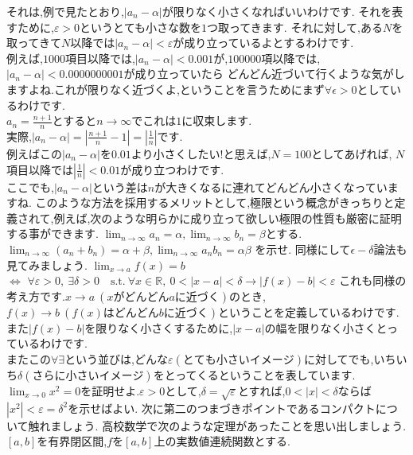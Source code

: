 それは,例で見たとおり,$|a_n - \alpha|$が限りなく小さくなればいいわけです.
それを表すために,$\varepsilon > 0$というとても小さな数を$1$つ取ってきます.
それに対して,ある$N$を取ってきて$N$以降では$|a_n - \alpha | < \varepsilon$が成り立っているよとするわけです.\\
例えば,$1000$項目以降では,$|a_n - \alpha| < 0.001$が,$100000$項以降では,$|a_n - \alpha | < 0.0000000001$が成り立っていたら
どんどん近づいて行くような気がしますよね.これが限りなく近づくよ,ということを言うためにまず$\forall \epsilon > 0$としているわけです.\\
\ex
$a_n = \frac{n+1}{n}$とすると$n \to \infty $でこれは$1$に収束します.\\
実際,$|a_n - \alpha| = | \frac{n+1}{n} - 1 | = | \frac{1}{n} |$です.\\
例えばこの$|a_n - \alpha|$を$0.01$より小さくしたい!と思えば,$N=100$としてあげれば,
$N$項目以降では$|\frac{1}{n}| < 0.01$が成り立つわけです.\\
ここでも,$|a_n - \alpha| $という差は$n$が大きくなるに連れてどんどん小さくなっていますね.
\exx
このような方法を採用するメリットとして,極限という概念がきっちりと定義されて,例えば,次のような明らかに成り立って欲しい極限の性質も厳密に証明する事ができます.
\prob
$\lim_{n\to\infty} a_n = \alpha , \lim_{n\to\infty} b_n = \beta $とする.\\
$\lim_{n\to\infty} (a_n + b_n) = \alpha + \beta , \lim_{n\to\infty} a_n b_n = \alpha\beta $
を示せ.
\probx
同様にして$\epsilon-\delta$論法も見てみましょう.
$\lim_{x \to a}f(x) = b$\\
$\iff$
$\forall \varepsilon > 0,\  \exists \delta > 0\quad \textrm{s.t.}\  \forall x \in \mathbb{R},\  0 < |x-a| < \delta \to |f(x)-b| < \varepsilon$
これも同様の考え方です.$x\to a\  (xがどんどんaに近づく)$のとき,$f(x) \to b\  (f(x)はどんどんbに近づく)$ということを定義しているわけです.また$|f(x)-b|$を限りなく小さくするために,$|x-a|$の幅を限りなく小さくとっているわけです.\\
またこの$\forall \exists$という並びは,どんな$\varepsilon (とても小さいイメージ)$に対してでも,いちいち$\delta (さらに小さいイメージ)$をとってくるということを表しています.
\prob
$\lim_{x\to 0} x^2 = 0$を証明せよ.$\varepsilon >0$として,$\delta = \sqrt{\varepsilon}$とすれば,$ 0 < | x | < \delta$ならば$ |x^2| < \varepsilon = \delta^2$を示せばよい. 
\probx
{}
次に第二のつまづきポイントであるコンパクトについて触れましょう.
高校数学で次のような定理があったことを思い出しましょう.
\thm[最大値最小値の定理]
$[a,b]$を有界閉区間,$f$を$[a,b]$上の実数値連続関数とする.
